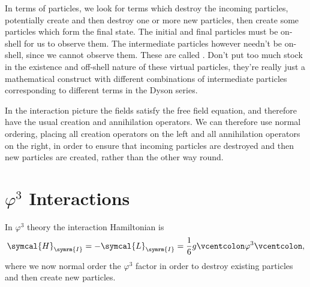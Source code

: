 \documentclass[fleqn]{NotesClass}
\newcommand{\lagrangianDensity}{\symcal{L}}
\newcommand{\hamiltonianDensity}{\symcal{H}}
\newcommand{\normalordering}[1]{\mathopen{\vcentcolon}{#1}\mathclose{\vcentcolon}}
\newcommand{\interaction}{\symrm{I}}
\begin{document}
    In terms of particles, we look for terms which destroy the incoming particles, potentially create and then destroy one or more new particles, then create some particles which form the final state.
    The initial and final particles must be on-shell for us to observe them.
    The intermediate particles however needn't be on-shell, since we cannot observe them.
    These are called .
    Don't put too much stock in the existence and off-shell nature of these virtual particles, they're really just a mathematical construct with different combinations of intermediate particles corresponding to different terms in the Dyson series.
    
    In the interaction picture the fields satisfy the free field equation, and therefore have the usual creation and annihilation operators.
    We can therefore use normal ordering, placing all creation operators on the left and all annihilation operators on the right, in order to ensure that incoming particles are destroyed and then new particles are created, rather than the other way round.
    
    \section{\texorpdfstring{\(\varphi^3\)}{Phi Cubed} Interactions}
    In \(\varphi^3\) theory the interaction Hamiltonian is
    \begin{equation}
        \hamiltonianDensity_{\interaction} = -\lagrangianDensity_{\interaction} = \frac{1}{6}g\normalordering{\varphi^3},
    \end{equation}
    where we now normal order the \(\varphi^3\) factor in order to destroy existing particles and then create new particles.
    
\end{document}
